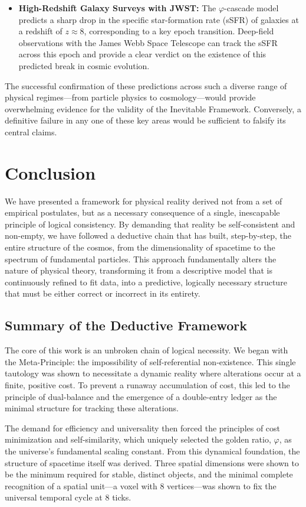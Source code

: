 \documentclass[11pt,a4paper]{article}
\begin{document}
\begin{itemize}
    \item \textbf{High-Redshift Galaxy Surveys with JWST:} The \(\varphi\)-cascade model predicts a sharp drop in the specific star-formation rate (sSFR) of galaxies at a redshift of \(z \approx 8\), corresponding to a key epoch transition. Deep-field observations with the James Webb Space Telescope can track the sSFR across this epoch and provide a clear verdict on the existence of this predicted break in cosmic evolution.
\end{itemize}
The successful confirmation of these predictions across such a diverse range of physical regimes—from particle physics to cosmology—would provide overwhelming evidence for the validity of the Inevitable Framework. Conversely, a definitive failure in any one of these key areas would be sufficient to falsify its central claims.

\section{Conclusion}

We have presented a framework for physical reality derived not from a set of empirical postulates, but as a necessary consequence of a single, inescapable principle of logical consistency. By demanding that reality be self-consistent and non-empty, we have followed a deductive chain that has built, step-by-step, the entire structure of the cosmos, from the dimensionality of spacetime to the spectrum of fundamental particles. This approach fundamentally alters the nature of physical theory, transforming it from a descriptive model that is continuously refined to fit data, into a predictive, logically necessary structure that must be either correct or incorrect in its entirety.

\subsection{Summary of the Deductive Framework}
The core of this work is an unbroken chain of logical necessity. We began with the Meta-Principle: the impossibility of self-referential non-existence. This single tautology was shown to necessitate a dynamic reality where alterations occur at a finite, positive cost. To prevent a runaway accumulation of cost, this led to the principle of dual-balance and the emergence of a double-entry ledger as the minimal structure for tracking these alterations.

The demand for efficiency and universality then forced the principles of cost minimization and self-similarity, which uniquely selected the golden ratio, \(\varphi\), as the universe's fundamental scaling constant. From this dynamical foundation, the structure of spacetime itself was derived. Three spatial dimensions were shown to be the minimum required for stable, distinct objects, and the minimal complete recognition of a spatial unit—a voxel with 8 vertices—was shown to fix the universal temporal cycle at 8 ticks.
\end{document}
